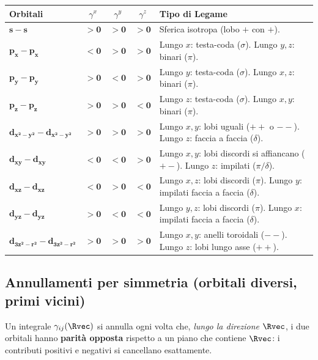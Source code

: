 \vspace{-0.2cm}
\begin{table}[htpb]
\centering
\renewcommand{\arraystretch}{1.3}
{\small
\begin{tabular}{l c c c l}
\toprule
Orbitali & $\gamma^x$ & $\gamma^y$ & $\gamma^z$ &  Tipo di Legame \\
\midrule
$\bm{s - s}$ & $\bm{> 0}$ & $\bm{> 0}$ & $\bm{> 0}$ & Sferica isotropa (lobo $+$ con $+$). \\
$\bm{p_x - p_x}$ & $\bm{< 0}$ & $\bm{> 0}$ & $\bm{> 0}$ & Lungo $x$: testa-coda ($\sigma$). Lungo $y,z$: binari ($\pi$). \\
$\bm{p_y - p_y}$ & $\bm{> 0}$ & $\bm{< 0}$ & $\bm{> 0}$ & Lungo $y$: testa-coda ($\sigma$). Lungo $x,z$: binari ($\pi$). \\
$\bm{p_z - p_z}$ & $\bm{> 0}$ & $\bm{> 0}$ & $\bm{< 0}$ & Lungo $z$: testa-coda ($\sigma$). Lungo $x,y$: binari ($\pi$). \\
$\bm{d_{x^2-y^2} - d_{x^2-y^2}}$ & $\bm{> 0}$ & $\bm{> 0}$ & $\bm{> 0}$ & Lungo $x,y$: lobi uguali ($++$ o $--$). Lungo $z$: faccia a faccia ($\delta$). \\
$\bm{d_{xy} - d_{xy}}$ & $\bm{< 0}$ & $\bm{< 0}$ & $\bm{> 0}$ & Lungo $x,y$: lobi discordi si affiancano ($+-$). Lungo $z$: impilati ($\pi/\delta$). \\
$\bm{d_{xz} - d_{xz}}$ & $\bm{< 0}$ & $\bm{> 0}$ & $\bm{< 0}$ & Lungo $x,z$: lobi discordi ($\pi$). Lungo $y$: impilati faccia a faccia ($\delta$). \\
$\bm{d_{yz} - d_{yz}}$ & $\bm{> 0}$ & $\bm{< 0}$ & $\bm{< 0}$ & Lungo $y,z$: lobi discordi ($\pi$). Lungo $x$: impilati faccia a faccia ($\delta$). \\
$\bm{d_{3z^2-r^2} - d_{3z^2-r^2}}$ & $\bm{> 0}$ & $\bm{> 0}$ & $\bm{> 0}$ & Lungo $x,y$: anelli toroidali ($--$). Lungo $z$: lobi lungo asse ($++$). \\
\bottomrule
\end{tabular}}
\end{table}


\subsection{Annullamenti per simmetria (orbitali diversi, primi vicini)}
Un integrale $\gamma_{ij}(\Rvec)$ si annulla ogni volta che, \emph{lungo la direzione} $\Rvec$, i due orbitali hanno \textbf{parità opposta} rispetto a un piano che contiene $\Rvec$: i contributi positivi e negativi si cancellano esattamente.

